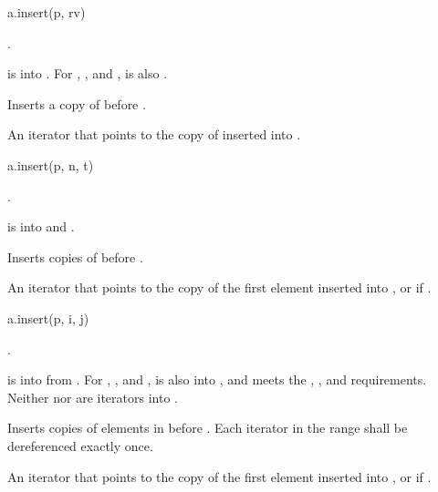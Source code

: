\begin{itemdecl}
a.insert(p, rv)
\end{itemdecl}

\begin{itemdescr}
\pnum
\result
{}.

\pnum
\expects
{} is  into .
For , , and ,
 is also .

\pnum
\effects
Inserts a copy of  before .

\pnum
\returns
An iterator that points to the copy of  inserted into .
\end{itemdescr}

\begin{itemdecl}
a.insert(p, n, t)
\end{itemdecl}

\begin{itemdescr}
\pnum
\result
{}.

\pnum
\expects
{} is  into 
and .

\pnum
\effects
Inserts  copies of  before .

\pnum
\returns
An iterator
that points to the copy of the first element inserted into , or
 if .
\end{itemdescr}

\begin{itemdecl}
a.insert(p, i, j)
\end{itemdecl}

\begin{itemdescr}
\pnum
\result
{}.

\pnum
\expects
{} is  into  from .
For , , and ,
 is also
 into ,
and  meets the
,
, and
 requirements.
Neither  nor  are iterators into .

\pnum
\effects
Inserts copies of elements in  before .
Each iterator in the range  shall be dereferenced exactly once.

\pnum
\returns
An iterator
that points to the copy of the first element inserted into , or
 if .
\end{itemdescr}

